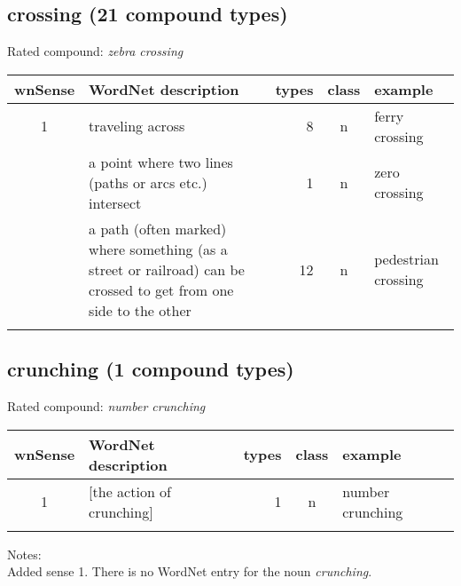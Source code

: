 \pagebreak[4]
\subsection{crossing  (21 compound types)}
Rated compound: \emph{zebra crossing}
\vspace*{-.3cm}


\noindent
\begin{longtable}{c>{\raggedright\arraybackslash}p{5cm}rc>{\raggedright\arraybackslash}p{2cm}}\lsptoprule
{\small wnSense}&WordNet description&types&class&example\\\midrule
1&traveling across&8&n&ferry crossing\\\tablevspace
3&a point where two lines (paths or arcs etc.) intersect&1&n&zero crossing\\\tablevspace
5&a path (often marked) where something (as a street or railroad) can be crossed to get from one side to the other&12&n&pedestrian crossing\\\lspbottomrule
\end{longtable}
\vspace*{-.3cm}


\subsection{crunching (1 compound types)}
Rated compound: \emph{number crunching}
\vspace*{-.3cm}


\noindent
\begin{longtable}{c>{\raggedright\arraybackslash}p{5cm}rc>{\raggedright\arraybackslash}p{2cm}}\lsptoprule
{\small wnSense}&WordNet description&types&class&example\\\midrule
1&{}[the action of crunching]&1&n&number crunching\\\lspbottomrule
\end{longtable}
\vspace*{-.3cm}

\noindent
Notes:\\Added sense 1. There is no WordNet entry for the noun \emph{crunching}.

